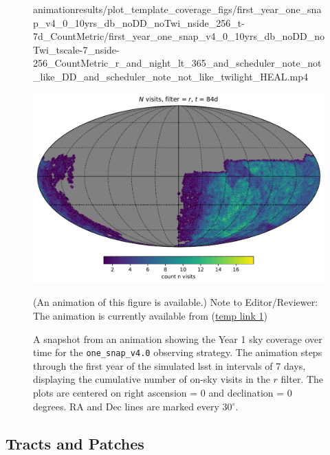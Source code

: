 \documentclass[preprintm,linenumbers]{aastex631}
\newcommand{\baseline}{\texttt{one\_snap\_v4.0}\xspace}
\begin{document}
 		
		\begin{figure}
			\begin{center}
				\begin{interactive}{animation}{results/plot_template_coverage_figs/first_year_one_snap_v4_0_10yrs_db_noDD_noTwi_nside_256_t-7d_CountMetric/first_year_one_snap_v4_0_10yrs_db_noDD_noTwi_tscale-7_nside-256_CountMetric_r_and_night_lt_365_and_scheduler_note_not_like_DD_and_scheduler_note_not_like_twilight_HEAL.mp4}
				\end{interactive}
				\includegraphics[width=0.5\columnwidth]{results/first_year_one_snap_v4_0_10yrs_db_noDD_noTwi_tscale-7_nside-256_CountMetric_r_and_night_lt_84_and_scheduler_note_not_like_DD_and_scheduler_note_not_like_twilight_HEAL.pdf}
				\caption{A snapshot from an animation showing the Year 1 sky coverage over time for the \baseline observing strategy. 
    The animation steps through the first year of the simulated \gls*{lsst} in intervals of 7 days, displaying the cumulative number of on-sky visits in the $r$ filter. 
    The plots are centered on right ascension = 0 and declination = 0 degrees. RA and Dec lines are marked every 30$^\circ$.} (An animation of this figure is available.)  Note to Editor/Reviewer: The animation is currently available from (\href{https://cuillin.roe.ac.uk/~jrobinson/LSST-Incremental-Templates-Analysis-Paper_4_0/first_year_one_snap_v4_0_10yrs_db_noDD_noTwi_tscale-7_nside-256_CountMetric_r_and_night_lt_365_and_scheduler_note_not_like_DD_and_scheduler_note_not_like_twilight_HEAL.mp4}{temp link 1}) \label{animation:baseline}
			\end{center}
		\end{figure}
	
	
	
	
	\subsection{Tracts and Patches}
	\label{sec:tractsandpatches} 
	
\end{document}

